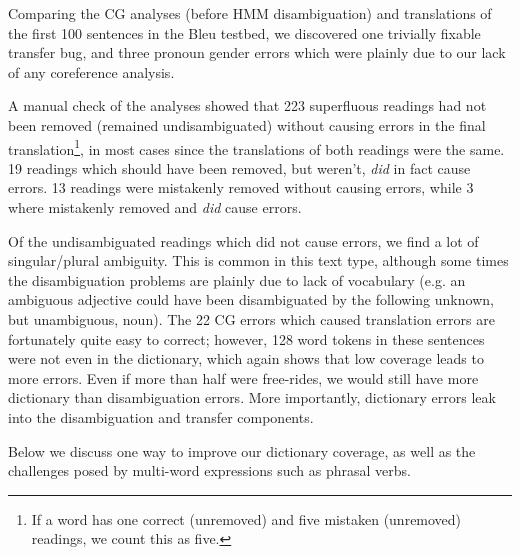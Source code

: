 \documentclass[11pt]{article}
\begin{document}
Comparing the CG analyses (before HMM disambiguation) and translations
of the first 100 sentences in the {\sc Bleu} testbed, we discovered
one trivially fixable transfer bug, and three pronoun gender errors
which were plainly due to our lack of any coreference analysis.

A manual check of the analyses showed that 223 superfluous readings
had not been removed (remained undisambiguated) without causing errors
in the final translation\footnote{If a word has one correct
  (unremoved) and five mistaken (unremoved) readings, we count this as
  five.}, in most cases since the translations of both readings were
the same. 19 readings which should have been removed, but weren't,
\emph{did} in fact cause errors.  13 readings were mistakenly removed
without causing errors, while 3 where mistakenly removed and
\emph{did} cause errors.

Of the undisambiguated readings which did not cause errors, we find a
lot of singular/plural ambiguity. This is common in this text type,
although some times the disambiguation problems are plainly due to
lack of vocabulary (e.g. an ambiguous adjective could have been
disambiguated by the following unknown, but unambiguous, noun). The 22
CG errors which caused translation errors are fortunately quite easy
to correct; however, 128 word tokens in these sentences were not even
in the dictionary, which again shows that low coverage leads to more
errors. Even if more than half were free-rides, we would still have
more dictionary than disambiguation errors. More importantly,
dictionary errors leak into the disambiguation and transfer
components. 

Below we discuss one way to improve our dictionary coverage, as well
as the challenges posed by multi-word expressions such as phrasal
verbs.
\end{document}
